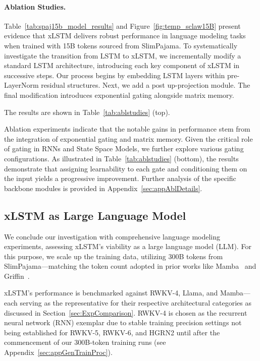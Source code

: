 \paragraph{Ablation Studies.}
Table~\ref{tab:spaj15b_model_results} and Figure~\ref{fig:temp_sclaw15B} present evidence that xLSTM delivers robust performance in language modeling tasks when trained with 15B tokens sourced from SlimPajama. To systematically investigate the transition from LSTM to xLSTM, we incrementally modify a standard LSTM architecture, introducing each key component of xLSTM in successive steps. Our process begins by embedding LSTM layers within pre-LayerNorm residual structures. Next, we add a post up-projection module. The final modification introduces exponential gating alongside matrix memory.

The results are shown in Table~\ref{tab:ablstudies} (top). 

Ablation experiments indicate that the notable gains in performance stem from the integration of exponential gating and matrix memory. Given the critical role of gating in RNNs and State Space Models, we further explore various gating configurations. As illustrated in Table~\ref{tab:ablstudies} (bottom), the results demonstrate that assigning learnability to each gate and conditioning them on the input yields a progressive improvement. Further analysis of the specific backbone modules is provided in Appendix~\ref{sec:appAblDetails}.

\subsection{xLSTM as Large Language Model}
\label{sec:ExpLanguage}

We conclude our investigation with comprehensive language modeling experiments, assessing xLSTM’s viability as a large language model (LLM). For this purpose, we scale up the training data, utilizing 300B tokens from SlimPajama—matching the token count adopted in prior works like Mamba~\citep{Gu:24arxiv} and Griffin~\citep{De:24arxiv}.

xLSTM's performance is benchmarked against RWKV-4, Llama, and Mamba—each serving as the representative for their respective architectural categories as discussed in Section~\ref{sec:ExpComparison}. RWKV-4 is chosen as the recurrent neural network (RNN) exemplar due to stable training precision settings not being established for RWKV-5, RWKV-6, and HGRN2 until after the commencement of our 300B-token training runs (see Appendix~\ref{sec:appGenTrainProc}).

